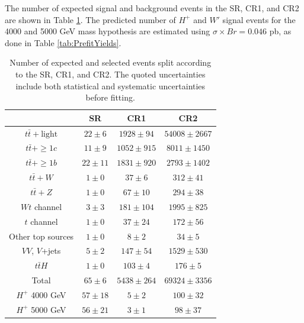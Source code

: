 The number of expected signal and background events in the SR, CR1, and CR2 are shown in Table \ref{tab:PrefitYieldsAbove3TeV}. The predicted number of $H^{+}$ and $W'$ signal events for the 4000 and 5000 GeV mass hypothesis are estimated using $\sigma \times Br = 0.046$ pb, as done in Table \ref{tab:PrefitYields}.

\begin{table}[H]
  \centering
  \begin{tabular*}{130mm}{@{\extracolsep{\fill}}cccc}
    \hline\hline
                            & SR           & CR1             & CR2\\
    \hline
    $t\bar{t}+\text{light}$ & $22 \pm  6$  & $1928 \pm  94$  & $ 54008 \pm  2667$\\
    $t\bar{t}+\geq1c$       & $11 \pm  9$  & $1052 \pm 915$  & $  8011 \pm  1450$\\
    $t\bar{t}+\geq1b$       & $22 \pm 11$  & $1831 \pm 920$  & $  2793 \pm  1402$\\
    $t\bar{t}+W$            & $ 1 \pm  0$  & $  37 \pm   6$  & $   312 \pm    41$\\
    $t\bar{t}+Z$            & $ 1 \pm  0$  & $  67 \pm  10$  & $   294 \pm    38$\\
    $Wt$ channel            & $ 3 \pm  3$  & $ 181 \pm 104$  & $  1995 \pm   825$\\
    $t$ channel             & $ 1 \pm  0$  & $  37 \pm  24$  & $   172 \pm    56$\\
    Other top sources       & $ 1 \pm  0$  & $   8 \pm   2$  & $    34 \pm     5$\\
    $VV$, $V$+jets          & $ 5 \pm  2$  & $ 147 \pm  54$  & $  1529 \pm   530$\\
    $t\bar{t}H$             & $ 1 \pm  0$  & $ 103 \pm   4$  & $   176 \pm     5$\\
    \hline
    Total                   & $65 \pm  6$  & $5438 \pm 264$  & $ 69324 \pm  3356$\\
    \hline
    $H^{+}$ 4000 GeV        & $57 \pm 18$  & $   5 \pm   2$  & $   100 \pm    32$\\
    $H^{+}$ 5000 GeV        & $56 \pm 21$  & $   3 \pm   1$  & $    98 \pm    37$\\
    \hline\hline
  \end{tabular*}
  \caption{Number of expected and selected events split according to the SR, CR1, and CR2. The quoted uncertainties include both statistical and systematic uncertainties before fitting.}
  \label{tab:PrefitYieldsAbove3TeV}
\end{table}